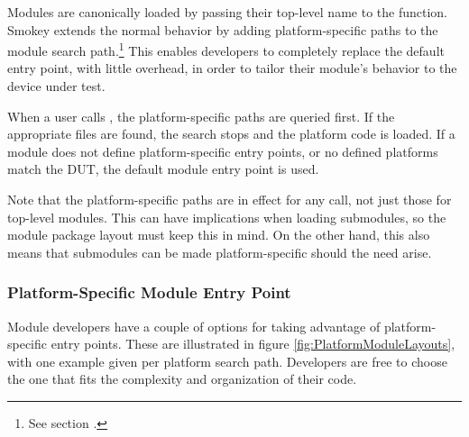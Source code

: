 Modules are canonically loaded by passing their top-level name to the
 function.  Smokey extends the normal 
behavior by adding platform-specific paths to the module search
path.\footnote{See section .}  This enables
developers to completely replace the default entry point, with little overhead,
in order to tailor their module's behavior to the device under test.

When a user calls , the platform-specific paths are queried
first.  If the appropriate files are found, the search stops and the platform
code is loaded.  If a module does not define platform-specific entry points, or
no defined platforms match the DUT, the default module entry point is used.

Note that the platform-specific paths are in effect for any 
call, not just those for top-level modules.  This can have implications when
loading submodules, so the module package layout must keep this in mind.  On
the other hand, this also means that submodules can be made platform-specific
should the need arise.

\subsubsection{Platform-Specific Module Entry Point}

Module developers have a couple of options for taking advantage of
platform-specific entry points.  These are illustrated in figure
\ref{fig:PlatformModuleLayouts}, with one example given per platform search
path.  Developers are free to choose the one that fits the complexity and
organization of their code.

